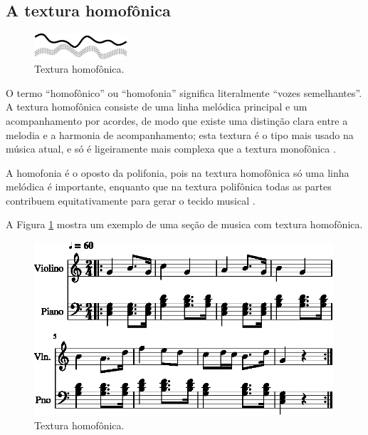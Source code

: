 
\subsection{A textura homofônica}
\label{subsec:homofonica}
\begin{figure}
  \centering
    \includegraphics[width=0.31\textwidth]{chapters/cap-musicalidade-percepcion/honofonica1.eps}
  \caption{Textura homofônica.}
\end{figure}
O termo ``homofônico'' ou ``homofonia'' significa literalmente ``vozes semelhantes''.%
A textura homofônica consiste de uma linha melódica principal e um acompanhamento por acordes,
de modo que existe uma distinção clara entre a melodia e a harmonia de acompanhamento;
esta textura é o tipo  mais usado na música atual,
e só é ligeiramente mais complexa que a textura monofônica 
\cite[pp. 78]{copland1974ouvir} \cite[pp. 29]{kerman2015listen} 
\cite[pp. 43]{bennett1993elementos} \cite[pp. 58]{holland2013music}.


A homofonia é o oposto da polifonia, 
pois na textura homofônica só uma linha melódica é importante,
enquanto que na textura polifônica todas as partes contribuem equitativamente para gerar o tecido musical
\cite[pp. 687]{apel1969harvard}.

\begin{example}
A Figura \ref{fig:ex:homofonica} mostra um exemplo de uma seção de musica com textura homofônica.
\end{example}

\begin{figure}[!h]
\centering
    \includegraphics[width=0.99\textwidth]{chapters/cap-musicalidade-percepcion/textura-homofonica-1.eps}
  \caption{Textura homofônica.}
\label{fig:ex:homofonica}
\end{figure}

